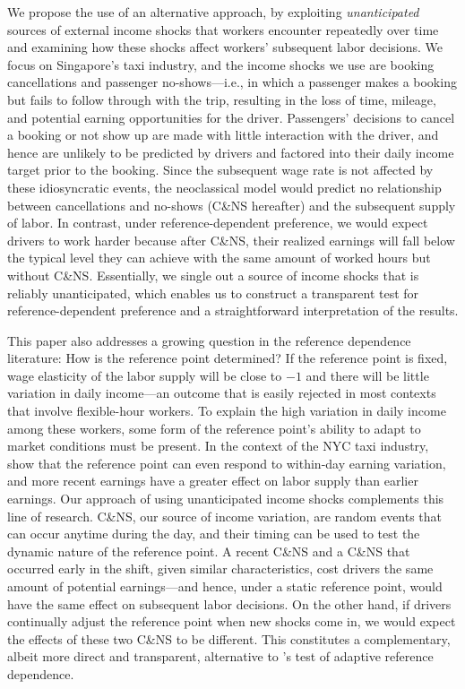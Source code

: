 \documentclass[reviewmode]{restud}
\begin{document}
We propose the use of an alternative approach, by exploiting \textit{unanticipated} sources of external income shocks that workers encounter repeatedly over time and examining how these shocks affect workers' subsequent labor decisions. We focus on Singapore's taxi industry, and the income shocks we use are booking cancellations and passenger no-shows---i.e., in which a passenger makes a booking but fails to follow through with the trip, resulting in the loss of time, mileage, and potential earning opportunities for the driver. Passengers' decisions to cancel a booking or not show up are made with little interaction with the driver, and hence are unlikely to be predicted by drivers and factored into their daily income target prior to the booking. Since the subsequent wage rate is not affected by these idiosyncratic events, the neoclassical model would predict no relationship between cancellations and no-shows (C\&NS hereafter) and the subsequent supply of labor. In contrast, under reference-dependent preference, we would expect drivers to work harder because after C\&NS, their realized earnings will fall below the typical level they can achieve with the same amount of worked hours but without C\&NS. Essentially, we single out a source of income shocks that is reliably unanticipated, which enables us to construct a transparent test for reference-dependent preference and a straightforward interpretation of the results.


This paper also addresses a growing question in the reference dependence literature: How is the reference point determined? If the reference point is fixed, wage elasticity of the labor supply will be close to $-1$ and there will be little variation in daily income---an outcome that is easily rejected in most contexts that involve flexible-hour workers. To explain the high variation in daily income among these workers, some form of the reference point's ability to adapt to market conditions must be present. In the context of the NYC taxi industry, \citet{thakral2018daily} show that the reference point can even respond to within-day earning variation, and more recent earnings have a greater effect on labor supply than earlier earnings. Our approach of using unanticipated income shocks complements this line of research. C\&NS, our source of income variation, are random events that can occur anytime during the day, and their timing can be used to test the dynamic nature of the reference point. A recent C\&NS and a C\&NS that occurred early in the shift, given similar characteristics, cost drivers the same amount of potential earnings---and hence, under a static reference point, would have the same effect on subsequent labor decisions. On the other hand, if drivers continually adjust the reference point when new shocks come in, we would expect the effects of these two C\&NS to be different. This constitutes a complementary, albeit more direct and transparent, alternative to  \citeauthor{thakral2018daily}'s test of adaptive reference dependence.
\end{document}
